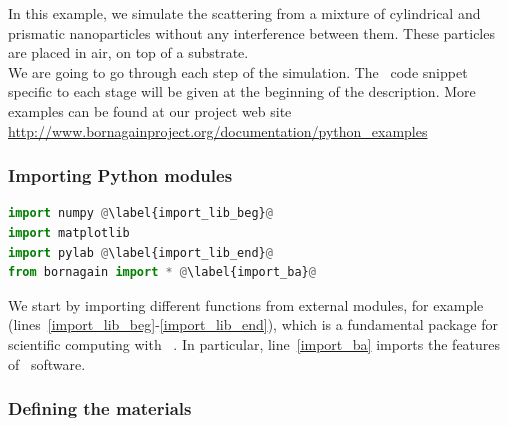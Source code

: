 

In this example, we simulate the scattering from a mixture of
cylindrical and prismatic nanoparticles without any interference
between them. These particles are placed in air, on top
of a substrate.\\ We are going to go through each step of the
simulation. The \Python\ code snippet specific to each stage will be given at
the beginning of the description. 
More examples can be found at our project web site \url{http://www.bornagainproject.org/documentation/python_examples}


\subsubsection{Importing Python modules}

\begin{lstlisting}[language=python, style=eclipseboxed,name=ex1,nolol]
import numpy @\label{import_lib_beg}@
import matplotlib
import pylab @\label{import_lib_end}@
from bornagain import * @\label{import_ba}@
\end{lstlisting}
We start by importing different functions from external
modules, for example  (lines~\ref{import_lib_beg}-\ref{import_lib_end}), which
is a fundamental package for scientific computing with \Python\
\cite{s:numpy}.  In particular, line~\ref{import_ba}
imports the features of \BornAgain\ software.

\subsubsection{Defining the materials} 

